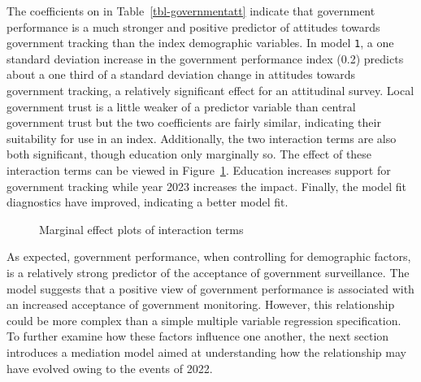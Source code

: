 \documentclass[
  letterpaper,
  DIV=11,
  numbers=noendperiod]{scrartcl}
\begin{document}
The coefficients on in Table~\ref{tbl-governmentatt} indicate that
government performance is a much stronger and positive predictor of
attitudes towards government tracking than the index demographic
variables. In model \texttt{1}, a one standard deviation increase in the
government performance index (0.2) predicts about a one third of a
standard deviation change in attitudes towards government tracking, a
relatively significant effect for an attitudinal survey. Local
government trust is a little weaker of a predictor variable than central
government trust but the two coefficients are fairly similar, indicating
their suitability for use in an index. Additionally, the two interaction
terms are also both significant, though education only marginally so.
The effect of these interaction terms can be viewed in
Figure~\ref{fig-marginplotperform}. Education increases support for
government tracking while year 2023 increases the impact. Finally, the
model fit diagnostics have improved, indicating a better model fit.

\begin{figure}


\caption{\label{fig-marginplotperform}Marginal effect plots of
interaction terms}

\end{figure}%

As expected, government performance, when controlling for demographic
factors, is a relatively strong predictor of the acceptance of
government surveillance. The model suggests that a positive view of
government performance is associated with an increased acceptance of
government monitoring. However, this relationship could be more complex
than a simple multiple variable regression specification. To further
examine how these factors influence one another, the next section
introduces a mediation model aimed at understanding how the relationship
may have evolved owing to the events of 2022.
\end{document}
